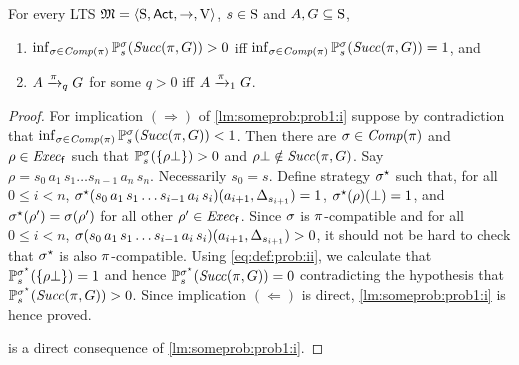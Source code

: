 \begin{lemma}\label{lm:someprob:prob1}
  For every LTS $\model = \tup{\S,\Act,\ra,\V}$, $s\in\S$ and
  $A,G\subseteq\S$,
  \begin{enumerate}
  \item\label{lm:someprob:prob1:i}%
    $\inf_{\strat\in\Comp(\plan)}\Prob^\strat_s(\Succ(\plan,G))>0$ iff\newline
    $\inf_{\strat\in\Comp(\plan)}\Prob^\strat_s(\Succ(\plan,G))=1$, and
  \item\label{lm:someprob:prob1:ii}%
    $A\reach{\plan}_q G$ for some $q>0$ iff $A\reach{\plan}_1 G$.
  \end{enumerate}
\end{lemma}
%
%
%
\begin{proof}
  For implication $(\Rightarrow)$ of \cref{lm:someprob:prob1:i}
  suppose by contradiction that
  $\inf_{\strat\in\Comp(\plan)}\Prob^\strat_s(\Succ(\plan,G))<1$.
  Then there are $\strat\in\Comp(\plan)$ and $\rho\in\execf$ such that
  $\Prob^\strat_s(\{\rho\complete\})>0$ and
  $\rho\complete\notin\Succ(\plan,G)$.
  Say $\rho=s_0\, a_1\, s_1\ldots s_{n-1}\, a_n\, s_n$.  Necessarily
  $s_0=s$.
  Define strategy $\strat^\star$ such that, for all $0\leq i<n$,
  $\strat^\star(s_0\, a_1\, s_1\ldots s_{i-1}\, a_i\, s_i)(a_{i+1},\Dirac_{s_{i+1}})=1$,
  $\strat^\star(\rho)(\complete)=1$, and
  $\strat^\star(\rho')=\strat(\rho')$ for all other $\rho'\in\execf$.
  Since $\strat$ is $\plan$-compatible and  for all $0\leq i<n$,
  $\strat(s_0\, a_1\, s_1\ldots s_{i-1}\, a_i\, s_i)(a_{i+1},\Dirac_{s_{i+1}})>0$,
  it should not be hard to check that $\strat^\star$ is also
  $\plan$-compatible.
  Using \cref{eq:def:prob:ii}, we calculate that
  $\Prob^{\strat^\star}_s(\{\rho\complete\})=1$ and hence
  $\Prob^{\strat^\star}_s(\Succ(\plan,G))=0$ contradicting the
  hypothesis that $\Prob^{\strat^\star}_s(\Succ(\plan,G))>0$.
  Since implication $(\Leftarrow)$ is direct,
  \cref{lm:someprob:prob1:i} is hence proved.

   is a direct consequence of
  \cref{lm:someprob:prob1:i}.
\end{proof}


